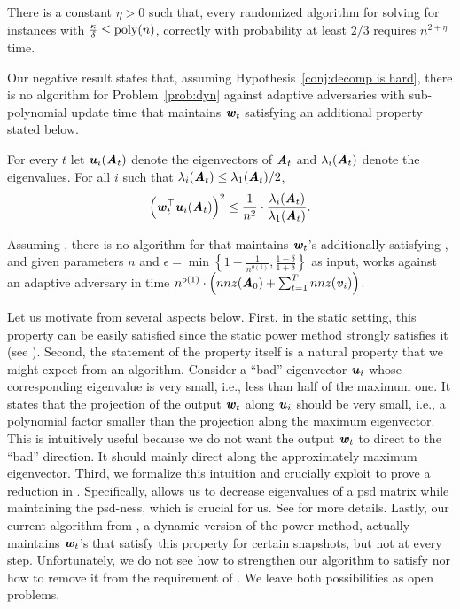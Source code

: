 \begin{hypothesis}
	\label{conj:decomp is hard}There is a constant $\eta>0$ such that, every randomized algorithm for solving  for instances with $\frac{\kappa}{\delta}\leq \poly(n)$, correctly with probability at least $2/3$ requires $n^{2+\eta}$ time. 
\end{hypothesis}


Our negative result states that, assuming  Hypothesis~\ref{conj:decomp is hard}, there is no  algorithm for Problem~\ref{prob:dyn} against adaptive adversaries with sub-polynomial update time
that maintains $\ww_t$ satisfying an additional property stated below.

\begin{property}\label{def:super}\label{prop:assume} For every $t$ let $\uu_i(\AA_t)$ denote the eigenvectors of $\AA_t$ and $\lambda_i(\AA_t)$ denote the eigenvalues. For all $i$ such that $\lambda_i(\AA_t)\leq \lambda_1(\AA_t)/2$,
\[
\left(\ww_t^{\top}\uu_i\left(\AA_{t}\right)\right)^2 \leq \frac{1}{n^2}\cdot \frac{\lambda_i\left(\AA_{t}\right)}{\lambda_1(\AA_t)}.
\]
\end{property}

\begin{theorem}
	\label{thm:lower}Assuming , there is no algorithm for  that maintains $\ww_t$'s additionally satisfying , and given parameters $n$ and $\epsilon=\min\left\{1-\frac{1}{n^{o(1)}},\frac{1-\delta}{1+\delta}\right\}$ as input, works against an adaptive adversary in time $n^{o(1)}\cdot \left(nnz(\AA_0) + \sum_{t=1}^T nnz(\vv_i)\right)$. 
\end{theorem}

Let us motivate  from several aspects below. First, in the static setting, this property can be easily satisfied since the static power method strongly satisfies it (see ). 
Second, the statement of the property itself is a natural property that we might expect from an algorithm. Consider a ``bad'' eigenvector $\uu_i$ whose corresponding eigenvalue is very small, i.e., less than half of the maximum one.
It states that the projection of the output $\ww_t$ along $\uu_i$ should be very small, i.e., a polynomial factor smaller than the projection along the maximum eigenvector. This is intuitively useful because we do not want the output $\ww_t$ to direct to the ``bad'' direction. It should mainly direct along the approximately maximum eigenvector.
Third, we formalize this intuition and crucially exploit  to prove a reduction in . 
Specifically,  allows us to decrease eigenvalues of a psd matrix while maintaining the psd-ness, which is crucial for us. See  for more details. 
Lastly, our current algorithm from , a dynamic version of the power method, actually maintains $\ww_t$'s that satisfy this property for certain snapshots, but not at every step. Unfortunately, we do not see how to strengthen our algorithm to satisfy  nor how to remove it from the requirement of . We leave both possibilities as open problems.



